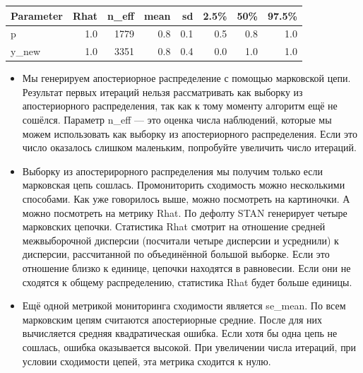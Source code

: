 \documentclass[12pt, a4paper, oneside]{extreport}
\theoremstyle{plain}              %
\theoremstyle{definition}         %
\begin{document}
\begin{center}
\begin{tabular}{lrrrrrrr}
	\toprule
	Parameter & Rhat & n\_eff & mean & sd & 2.5\% & 50\% & 97.5\% \\ 
	\midrule
	p & 1.0 & 1779 & 0.8 & 0.1 & 0.5 & 0.8 & 1.0 \\ 
	y\_new & 1.0 & 3351 & 0.8 & 0.4 & 0.0 & 1.0 & 1.0 \\ 
	\bottomrule
\end{tabular}
\end{center} 

\begin{itemize}
\item  Мы генерируем апостериорное распределение с помощью марковской цепи. Результат первых итераций нельзя рассматривать как выборку из апостериорного распределения, так как к тому моменту алгоритм ещё не сошёлся. Параметр n\_eff ---  это оценка числа наблюдений, которые мы можем использовать как выборку из апостериорного распределения. Если это число оказалось слишком маленьким, попробуйте увеличить число итераций. 

\item Выборку из апостерирорного распределения мы получим только если марковская цепь сошлась. Промониторить сходимость можно несколькими способами. Как уже говорилось выше, можно посмотреть на картиночки. А можно посмотреть на метрику Rhat. По дефолту STAN генерирует четыре марковских цепочки. Статистика Rhat смотрит на отношение средней межвыборочной дисперсии (посчитали четыре дисперсии и усреднили) к дисперсии, рассчитанной по объединённой большой выборке. Если это отношение близко к единице, цепочки находятся в равновесии. Если они не сходятся к общему распределению, статистика Rhat будет больше единицы. 

\item Ещё одной метрикой мониторинга сходимости является se\_mean.  По всем марковским цепям считаются апостериорные средние. После для них вычисляется средняя квадратическая ошибка. Если хотя бы одна цепь не сошлась, ошибка оказывается высокой. При увеличении числа итераций, при условии сходимости цепей, эта метрика сходится к нулю. 



\end{itemize} 
\end{document}
